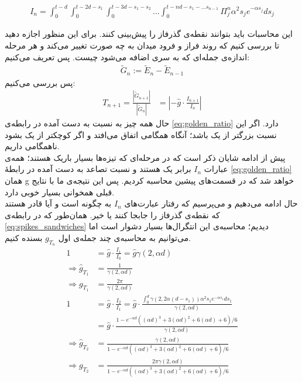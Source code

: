 \begin{align}
	I_n = \int_{0}^{t - d} \int_{0}^{t - 2d - s_1} \int_{0}^{t - 3d - s_1 - s_2} ... \int_{0}^{t - nd - s_1 - ... s_{n-1}} \Pi^n_j \alpha^2 s_j e^{-\alpha s_j} ds_j
	\label{eq:spikes_sandwiches}
\end{align}

این محاسبات باید بتوانند نقطه‌ی گذرفاز را پیش‌بینی کنند. برای این منظور اجازه دهید تا بررسی کنیم که روند فراز و فرود میدان به چه صورت تغییر می‌کند و هر مرحله اندازه‌ی جمله‌ای که به سری اضافه می‌شود چیست. پس تعریف می‌کنیم:
\begin{align}
	\tilde{G}_{n} := \tilde{E}_{n} - \tilde{E}_{n-1}
\end{align}
پس بررسی می‌کنیم:
\begin{align}
	T_{n+1} = \frac{|\tilde{G}_{n+1}|}{|\tilde{G}_{n}|} &= |-\hat{g} \cdot \frac{I_{n+1}}{I_n}|
	\label{eq:golden_ratio}
\end{align}
حال همه چیز به نسبت به دست آمده در رابطه‌ی
\ref{eq:golden_ratio}
دارد. اگر این نسبت بزرگتر از یک باشد؛ آنگاه همگامی اتفاق می‌افتد و اگر کوچکتر از یک بشود ناهمگامی داریم.\\
پیش از ادامه شایان ذکر است که در مرحله‌ای که تیزه‌ها بسیار باریک هستند؛ همه‌ی عبارات 
$I_n$
برابر یک هستند و نسبت تصاعد به دست آمده در رابطهٔ 
\ref{eq:golden_ratio}
همان g خواهد شد که در قسمت‌های پیشین محاسبه کردیم. پس این نتیجه‌ی ما با نتایج قبلی همخوانی بسیار خوبی دارد.\\

حال ادامه می‌دهیم و می‌پرسیم که رفتار عبارت‌های 
$I_n$
به چگونه است و آیا قادر هستند که نقطه‌ی گذرفاز را جابجا کنند یا خیر. همان‌طور که در رابطه‌ی 
\ref{eq:spikes_sandwiches}
دیدیم؛ محاسبه‌ی این انتگرال‌ها بسیار دشوار است اما می‌توانیم به محاسبه‌ی چند جمله‌ی اول 
$g_{T_n}$
بسنده کنیم.
\begin{align}
	1 &= \hat{g} \cdot \frac{I_1}{I_0} = \hat{g} \gamma(2,\alpha d)\\
	\Rightarrow \hat{g}_{T_1} &= \frac{1}{\gamma(2,\alpha d)}\\
	\Rightarrow g_{T_1} &= \frac{2\pi}{\gamma(2,\alpha d)}\\
	1 &= \hat{g} \cdot \frac{I_2}{I_1} = \hat{g} \cdot \frac{\int_0^{d} \gamma(2,2\alpha (d-s_1)) \alpha^2 s_1 e^{-\alpha s_1} ds_1 }{\gamma(2,\alpha d)}\\
	&= \hat{g} \cdot \frac{1 - e^{- \alpha d}( (\alpha d)^3 + 3(\alpha d)^2 + 6(\alpha d) + 6)/6}{\gamma(2,\alpha d)}\\
	\Rightarrow \hat{g}_{T_2} &= \frac{\gamma(2,\alpha d)}{1 - e^{- \alpha d}( (\alpha d)^3 + 3(\alpha d)^2 + 6(\alpha d) + 6)/6}\\
	\Rightarrow g_{T_2} &= \frac{2\pi \gamma(2,\alpha d)}{1 - e^{- \alpha d}( (\alpha d)^3 + 3(\alpha d)^2 + 6(\alpha d) + 6)/6}
\end{align}

